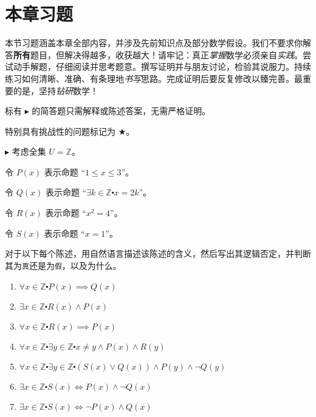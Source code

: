 \section{本章习题}

本节习题涵盖本章全部内容，并涉及先前知识点及部分数学假设。我们不要求你解答\textbf{所有}题目，但解决得越多，收获越大！请牢记：真正\emph{掌握}数学必须亲自\emph{实践}。尝试动手解题，仔细阅读并思考题意。撰写证明并与朋友讨论，检验其说服力。持续练习如何清晰、准确、有条理地\emph{书写}思路。完成证明后要反复修改以臻完善。最重要的是，坚持\emph{钻研}数学！

标有 $\blacktriangleright$ 的简答题只需解释或陈述答案，无需严格证明。

特别具有挑战性的问题标记为 $\bigstar$。

\begin{exercise}
    $\blacktriangleright$ 考虑全集 $U=\mathbb{Z}$。

    令 $P(x)$ 表示命题 ``$1 \le x \le 3$''。

    令 $Q(x)$ 表示命题 ``$\exists k \in \mathbb{Z} \centerdot x=2k$''。

    令 $R(x)$ 表示命题 ``$x^2=4$''。

    令 $S(x)$ 表示命题 ``$x=1$''。

    对于以下每个陈述，用自然语言描述该陈述的含义，然后写出其逻辑否定，并判断其为\verb|真|还是为\verb|假|，以及为什么。

    \begin{enumerate}[label=(\alph*)]
        \item $\forall x \in \mathbb{Z} \centerdot P(x) \implies Q(x)$
        \item $\exists x \in \mathbb{Z} \centerdot R(x) \land P(x)$
        \item $\forall x \in \mathbb{Z} \centerdot R(x) \implies P(x)$
        \item $\forall x \in \mathbb{Z} \centerdot \exists y \in \mathbb{Z} \centerdot x \ne y \land P(x) \land R(y)$
        \item $\forall x \in \mathbb{Z} \centerdot \exists y \in \mathbb{Z} \centerdot (S(x) \lor Q(x)) \land P(y) \land \neg Q(y)$
        \item $\exists x \in \mathbb{Z} \centerdot S(x) \iff P(x) \land \neg Q(x)$
        \item $\exists x \in \mathbb{Z} \centerdot S(x) \iff \neg P(x) \land Q(x)$
    \end{enumerate}
\end{exercise}

